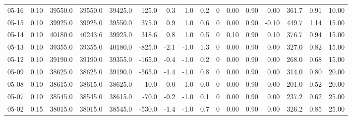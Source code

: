 \begin{threeparttable}
{\begin{tabular}{lrrrrrrrrrrrrrrr}
  05-16 &     0.10 & 39550.0 & 39550.0 & 39425.0 &      125.0 &            0.3 &                      1.0 &                 0.2 &              0 &       0.00 &      0.90 &           0.00 &            361.7 &            0.91 &                  10.00 \\
  05-15 &     0.10 & 39925.0 & 39925.0 & 39550.0 &      375.0 &            0.9 &                      1.0 &                 0.6 &              0 &       0.00 &      0.90 &          -0.10 &            449.7 &            1.14 &                  15.00 \\
  05-14 &     0.10 & 40180.0 & 40243.6 & 39925.0 &      318.6 &            0.8 &                      1.0 &                 0.5 &              0 &       0.10 &      0.90 &           0.10 &            376.7 &            0.94 &                  15.00 \\
  05-13 &     0.10 & 39355.0 & 39355.0 & 40180.0 &     -825.0 &           -2.1 &                     -1.0 &                 1.3 &              0 &       0.00 &      0.90 &           0.00 &            327.0 &            0.82 &                  15.00 \\
  05-12 &     0.10 & 39190.0 & 39190.0 & 39355.0 &     -165.0 &           -0.4 &                     -1.0 &                 0.2 &              0 &       0.00 &      0.90 &           0.00 &            268.0 &            0.68 &                  15.00 \\
  05-09 &     0.10 & 38625.0 & 38625.0 & 39190.0 &     -565.0 &           -1.4 &                     -1.0 &                 0.8 &              0 &       0.00 &      0.90 &           0.00 &            314.0 &            0.80 &                  20.00 \\
  05-08 &     0.10 & 38615.0 & 38615.0 & 38625.0 &      -10.0 &           -0.0 &                     -1.0 &                 0.0 &              0 &       0.00 &      0.90 &           0.00 &            201.0 &            0.52 &                  20.00 \\
  05-07 &     0.10 & 38545.0 & 38545.0 & 38615.0 &      -70.0 &           -0.2 &                     -1.0 &                 0.1 &              0 &       0.00 &      0.90 &           0.00 &            237.2 &            0.62 &                  25.00 \\
  05-02 &     0.15 & 38015.0 & 38015.0 & 38545.0 &     -530.0 &           -1.4 &                     -1.0 &                 0.7 &              0 &       0.00 &      0.90 &           0.00 &            326.2 &            0.85 &                  25.00 \\

\end{tabular}}
\end{threeparttable}
